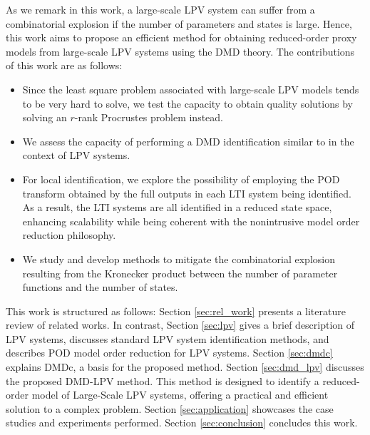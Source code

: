 As we remark in this work, a large-scale LPV system can suffer from a combinatorial explosion if the number of parameters and states is large.
%
Hence, this work aims to propose an efficient method for obtaining reduced-order proxy models from large-scale LPV systems using the DMD theory.
%
The contributions of this work are as follows:
\begin{itemize}
    \item Since the least square problem associated with large-scale LPV models tends to be very hard to solve, we test the capacity to obtain quality solutions by solving an $r$-rank Procrustes problem instead.
    \item We assess the capacity of performing a DMD identification similar to \cite{Gosea2021} in the context of LPV systems.
    \item For local identification, we explore the possibility of employing the POD transform obtained by the full outputs in each LTI system being identified. As a result, the LTI systems are all identified in a reduced state space, enhancing scalability while being coherent with the nonintrusive model order reduction philosophy.
    \item We study and develop methods to mitigate the combinatorial explosion resulting from the Kronecker product between the number of parameter functions and the number of states.
\end{itemize}

This work is structured as follows:
Section \ref{sec:rel_work} presents a literature review of related works. In contrast, Section \ref{sec:lpv} gives a brief description of LPV systems, discusses standard LPV system identification methods, and describes POD model order reduction for LPV systems.
 Section \ref{sec:dmdc} explains DMDc, a basis for the proposed method.
Section \ref{sec:dmd_lpv} discusses the proposed DMD-LPV method. This method is designed to identify a reduced-order model of Large-Scale LPV systems, offering a practical and efficient solution to a complex problem.
 Section \ref{sec:application} showcases the case studies and experiments performed.
 Section \ref{sec:conclusion} concludes this work.



